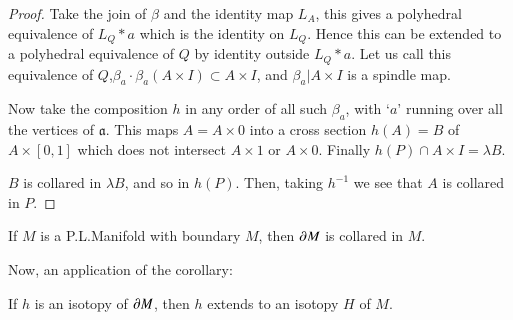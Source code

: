 \begin{proof}
Take the join of $\beta$ and the identity map $L_{A}$, this gives a polyhedral equivalence of $L_{Q}\ast a$ which is the identity on $L_{Q}$. Hence this can be extended to a polyhedral equivalence of $Q$ by identity outside $L_{Q}\ast a$. Let us call this equivalence of $Q$,\pageoriginale $\beta_{a}\cdot \beta_{a}(A\times I)\subset A\times I$, and $\beta_{a}|A\times I$ is a spindle map.

Now take the composition $h$ in any order of all such $\beta_{a}$, with `$a$' running over all the vertices of $\mathfrak{a}$. This maps $A=A\times 0$ into a cross section $h(A)=B$ of $A\times[0,1]$ which does not intersect $A\times 1$ or $A\times 0$. Finally $h(P)\cap A\times I=\lambda B$.

$B$ is collared in $\lambda B$, and so in $h(P)$. Then, taking $h^{-1}$ we see that $A$ is collared in $P$.
\end{proof}

\setcounter{proposition}{15}
\begin{corollary}\label{chap6-coro6.4.16}
If $M$ is a P.L.\@ Manifold with boundary $M$, then $\partial M$ is collared in $M$.
\end{corollary}

Now, an application of the corollary:

\begin{proposition}\label{chap6-prop6.4.17}
If $h$ is an isotopy of $\partial M$, then $h$ extends to an isotopy $H$ of $M$.
\end{proposition}

